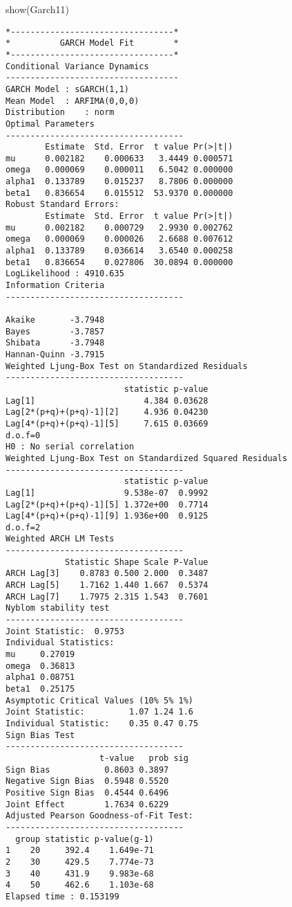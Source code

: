 \documentclass[
  ignorenonframetext,
]{beamer}
\newenvironment{Shaded}{\begin{snugshade}}{\end{snugshade}}
\newcommand{\FunctionTok}[1]{\textcolor[rgb]{0.00,0.00,0.00}{#1}}
\newcommand{\NormalTok}[1]{#1}
\newenvironment{Shaded}{\begin{snugshade}}{\end{snugshade}}
\newcommand{\FunctionTok}[1]{\textcolor[rgb]{0.00,0.00,0.00}{#1}}
\newcommand{\NormalTok}[1]{#1}
\begin{document}
\begin{frame}[fragile]
\begin{Shaded}
\begin{Highlighting}[]
\FunctionTok{show}\NormalTok{(Garch11)}
\end{Highlighting}
\end{Shaded}
\begin{verbatim}
*---------------------------------*
*          GARCH Model Fit        *
*---------------------------------*
Conditional Variance Dynamics   
-----------------------------------
GARCH Model : sGARCH(1,1)
Mean Model  : ARFIMA(0,0,0)
Distribution    : norm 
Optimal Parameters
------------------------------------
        Estimate  Std. Error  t value Pr(>|t|)
mu      0.002182    0.000633   3.4449 0.000571
omega   0.000069    0.000011   6.5042 0.000000
alpha1  0.133789    0.015237   8.7806 0.000000
beta1   0.836654    0.015512  53.9370 0.000000
Robust Standard Errors:
        Estimate  Std. Error  t value Pr(>|t|)
mu      0.002182    0.000729   2.9930 0.002762
omega   0.000069    0.000026   2.6688 0.007612
alpha1  0.133789    0.036614   3.6540 0.000258
beta1   0.836654    0.027806  30.0894 0.000000
LogLikelihood : 4910.635 
Information Criteria
------------------------------------
                    
Akaike       -3.7948
Bayes        -3.7857
Shibata      -3.7948
Hannan-Quinn -3.7915
Weighted Ljung-Box Test on Standardized Residuals
------------------------------------
                        statistic p-value
Lag[1]                      4.384 0.03628
Lag[2*(p+q)+(p+q)-1][2]     4.936 0.04230
Lag[4*(p+q)+(p+q)-1][5]     7.615 0.03669
d.o.f=0
H0 : No serial correlation
Weighted Ljung-Box Test on Standardized Squared Residuals
------------------------------------
                        statistic p-value
Lag[1]                  9.538e-07  0.9992
Lag[2*(p+q)+(p+q)-1][5] 1.372e+00  0.7714
Lag[4*(p+q)+(p+q)-1][9] 1.936e+00  0.9125
d.o.f=2
Weighted ARCH LM Tests
------------------------------------
            Statistic Shape Scale P-Value
ARCH Lag[3]    0.8783 0.500 2.000  0.3487
ARCH Lag[5]    1.7162 1.440 1.667  0.5374
ARCH Lag[7]    1.7975 2.315 1.543  0.7601
Nyblom stability test
------------------------------------
Joint Statistic:  0.9753
Individual Statistics:              
mu     0.27019
omega  0.36813
alpha1 0.08751
beta1  0.25175
Asymptotic Critical Values (10% 5% 1%)
Joint Statistic:         1.07 1.24 1.6
Individual Statistic:    0.35 0.47 0.75
Sign Bias Test
------------------------------------
                   t-value   prob sig
Sign Bias           0.8603 0.3897    
Negative Sign Bias  0.5948 0.5520    
Positive Sign Bias  0.4544 0.6496    
Joint Effect        1.7634 0.6229    
Adjusted Pearson Goodness-of-Fit Test:
------------------------------------
  group statistic p-value(g-1)
1    20     392.4    1.649e-71
2    30     429.5    7.774e-73
3    40     431.9    9.983e-68
4    50     462.6    1.103e-68
Elapsed time : 0.153199 
\end{verbatim}
\end{frame}
\end{document}
